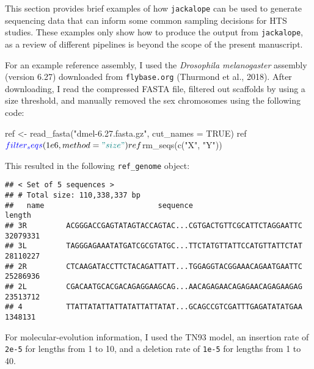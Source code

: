 \documentclass[12pt,]{article}
\newenvironment{Shaded}{}{}
\newcommand{\DataTypeTok}[1]{#1}
\newcommand{\FloatTok}[1]{#1}
\newcommand{\KeywordTok}[1]{\textcolor[rgb]{0.00,0.00,1.00}{#1}}
\newcommand{\NormalTok}[1]{#1}
\newcommand{\OperatorTok}[1]{#1}
\newcommand{\OtherTok}[1]{\textcolor[rgb]{1.00,0.25,0.00}{#1}}
\newcommand{\StringTok}[1]{\textcolor[rgb]{0.00,0.50,0.50}{#1}}
\begin{document}
This section provides brief examples of how \texttt{jackalope} can be used
to generate sequencing data that can inform some common sampling decisions for HTS
studies.
These examples only show how to produce the output from \texttt{jackalope}, as
a review of different pipelines is beyond the scope of the present manuscript.

For an example reference assembly, I used the \emph{Drosophila melanogaster} assembly
(version 6.27) downloaded from \texttt{flybase.org} (Thurmond et al., 2018).
After downloading, I read the compressed FASTA file, filtered out
scaffolds by using a size threshold, and manually removed the sex chromosomes
using the following code:

\begin{Shaded}
\begin{Highlighting}[]
\NormalTok{ref <-}\StringTok{ }\KeywordTok{read_fasta}\NormalTok{(}\StringTok{"dmel-6.27.fasta.gz"}\NormalTok{, }\DataTypeTok{cut_names =} \OtherTok{TRUE}\NormalTok{)}
\NormalTok{ref}\OperatorTok{$}\KeywordTok{filter_seqs}\NormalTok{(}\FloatTok{1e6}\NormalTok{, }\DataTypeTok{method =} \StringTok{"size"}\NormalTok{)}
\NormalTok{ref}\OperatorTok{$}\KeywordTok{rm_seqs}\NormalTok{(}\KeywordTok{c}\NormalTok{(}\StringTok{"X"}\NormalTok{, }\StringTok{"Y"}\NormalTok{))}
\end{Highlighting}
\end{Shaded}

This resulted in the following \texttt{ref\_genome} object:

\begin{verbatim}
## < Set of 5 sequences >
## # Total size: 110,338,337 bp
##   name                          sequence                             length
## 3R         ACGGGACCGAGTATAGTACCAGTAC...CGTGACTGTTCGCATTCTAGGAATTC  32079331
## 3L         TAGGGAGAAATATGATCGCGTATGC...TTCTATGTTATTCCATGTTATTCTAT  28110227
## 2R         CTCAAGATACCTTCTACAGATTATT...TGGAGGTACGGAAACAGAATGAATTC  25286936
## 2L         CGACAATGCACGACAGAGGAAGCAG...AACAGAGAACAGAGAACAGAGAAGAG  23513712
## 4          TTATTATATTATTATATTATTATAT...GCAGCCGTCGATTTGAGATATATGAA   1348131
\end{verbatim}

For molecular-evolution information, I used the TN93 model,
an insertion rate of \texttt{2e-5} for lengths from 1 to 10,
and
a deletion rate of \texttt{1e-5} for lengths from 1 to 40.
\end{document}
